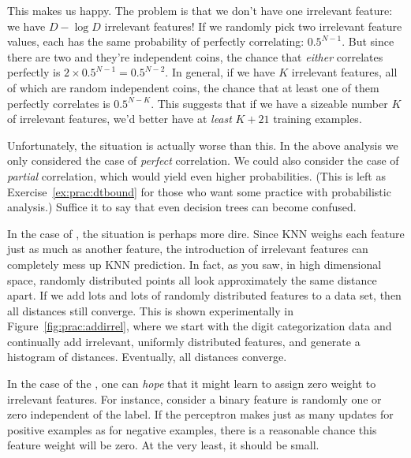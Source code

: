 This makes us happy.  The problem is that we don't have one irrelevant
feature: we have $D-\log D$ irrelevant features!  If we randomly pick
two irrelevant feature values, each has the same probability of
perfectly correlating: $0.5^{N-1}$.  But since there are two and
they're independent coins, the chance that \emph{either} correlates
perfectly is $2 \times 0.5^{N-1} = 0.5^{N-2}$.  In general, if we have
$K$ irrelevant features, all of which are random independent coins,
the chance that at least one of them perfectly correlates is
$0.5^{N-K}$.  This suggests that if we have a sizeable number $K$ of
irrelevant features, we'd better have at \emph{least} $K+21$ training
examples.

Unfortunately, the situation is actually worse than this.  In the
above analysis we only considered the case of \emph{perfect}
correlation.  We could also consider the case of \emph{partial}
correlation, which would yield even higher probabilities.  (This is
left as Exercise~\ref{ex:prac:dtbound} for those who want some
practice with probabilistic analysis.)  Suffice it to say that even
decision trees can become confused.


In the case of , the situation is
perhaps more dire.  Since KNN weighs each feature just as much as
another feature, the introduction of irrelevant features can
completely mess up KNN prediction.  In fact, as you saw, in high
dimensional space, randomly distributed points all look approximately
the same distance apart.  If we add lots and lots of randomly
distributed features to a data set, then all distances still
converge.  This is shown experimentally in
Figure~\ref{fig:prac:addirrel}, where we start with the digit
categorization data and continually add irrelevant, uniformly
distributed features, and generate a histogram of distances.
Eventually, all distances converge.

In the case of the , one can \emph{hope} that it
might learn to assign zero weight to irrelevant features.  For
instance, consider a binary feature is randomly one or zero
independent of the label.  If the perceptron makes just as many
updates for positive examples as for negative examples, there is a
reasonable chance this feature weight will be zero.  At the very
least, it should be small.


